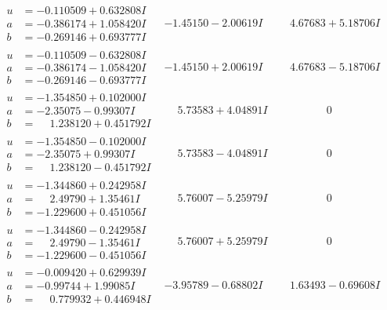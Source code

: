 \documentclass[1p]{elsarticle_modified}
\theoremstyle{definition}
\begin{document}
$$\begin{array}{c|c|c}
\begin{aligned}
u &= -0.110509 + 0.632808 I \\
a &= -0.386174 + 1.058420 I \\
b &= -0.269146 + 0.693777 I\end{aligned}
 & -1.45150 - 2.00619 I & \phantom{-}4.67683 + 5.18706 I \\ \hline\begin{aligned}
u &= -0.110509 - 0.632808 I \\
a &= -0.386174 - 1.058420 I \\
b &= -0.269146 - 0.693777 I\end{aligned}
 & -1.45150 + 2.00619 I & \phantom{-}4.67683 - 5.18706 I \\ \hline\begin{aligned}
u &= -1.354850 + 0.102000 I \\
a &= -2.35075 - 0.99307 I \\
b &= \phantom{-}1.238120 + 0.451792 I\end{aligned}
 & \phantom{-}5.73583 + 4.04891 I & \phantom{-0.000000 } 0 \\ \hline\begin{aligned}
u &= -1.354850 - 0.102000 I \\
a &= -2.35075 + 0.99307 I \\
b &= \phantom{-}1.238120 - 0.451792 I\end{aligned}
 & \phantom{-}5.73583 - 4.04891 I & \phantom{-0.000000 } 0 \\ \hline\begin{aligned}
u &= -1.344860 + 0.242958 I \\
a &= \phantom{-}2.49790 + 1.35461 I \\
b &= -1.229600 + 0.451056 I\end{aligned}
 & \phantom{-}5.76007 - 5.25979 I & \phantom{-0.000000 } 0 \\ \hline\begin{aligned}
u &= -1.344860 - 0.242958 I \\
a &= \phantom{-}2.49790 - 1.35461 I \\
b &= -1.229600 - 0.451056 I\end{aligned}
 & \phantom{-}5.76007 + 5.25979 I & \phantom{-0.000000 } 0 \\ \hline\begin{aligned}
u &= -0.009420 + 0.629939 I \\
a &= -0.99744 + 1.99085 I \\
b &= \phantom{-}0.779932 + 0.446948 I\end{aligned}
 & -3.95789 - 0.68802 I & \phantom{-}1.63493 - 0.69608 I \\ \hline\begin{aligned}

\end{aligned}
\end{array}$$
\end{document}
